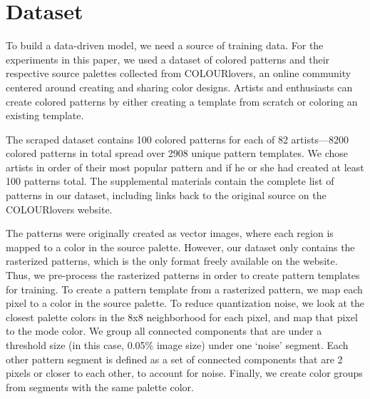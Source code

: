 \section{Dataset}
\label{sec:dataset}

To build a data-driven model, we need a source of training data. For the experiments in this paper, we used a dataset of colored patterns and their respective source palettes collected from COLOURlovers, an online community centered around creating and sharing color designs. Artists and enthusiasts can create colored patterns by either creating a template from scratch or coloring an existing template. 

The scraped dataset contains 100 colored patterns for each of 82 artists---8200 colored patterns in total spread over 2908 unique pattern templates. We chose artists in order of their most popular pattern and if he or she had created at least 100 patterns total. The supplemental materials contain the complete list of patterns in our dataset, including links back to the original source on the COLOURlovers website.

The patterns were originally created as vector images, where each region is mapped to a color in the source palette. However, our dataset only contains the rasterized patterns, which is the only format freely available on the website. Thus, we pre-process the rasterized patterns in order to create pattern templates for training. To create a pattern template from a rasterized pattern, we map each pixel to a color in the source palette. To reduce quantization noise, we look at the closest palette colors in the 8x8 neighborhood for each pixel, and map that pixel to the mode color. We group all connected components that are under a threshold size (in this case, 0.05\% image size) under one `noise' segment. Each other pattern segment is defined as a set of connected components that are 2 pixels or closer to each other, to account for noise. Finally, we create color groups from segments with the same palette color.

